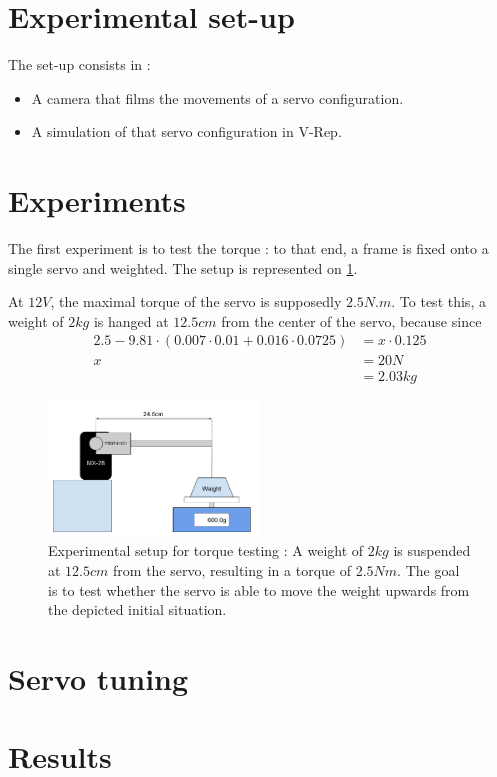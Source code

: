 \section{Experimental set-up}
The set-up consists in :
\begin{itemize}
\item A camera that films the movements of a servo configuration.
\item A simulation of that servo configuration in V-Rep.
\end{itemize}

\section{Experiments}
The first experiment is to test the torque : to that end, a frame is fixed onto a single servo and weighted. The setup is represented on \cref{fig:exp1}.

At $12V$, the maximal torque\cite{mx_28_manual} of the servo is supposedly $2.5N.m$. To test this, a weight of $2kg$ is hanged at $12.5cm$ from the center of the servo, because since 
\begin{align*}
2.5 - 9.81 \cdot (0.007 \cdot 0.01 + 0.016 \cdot 0.0725) &= x \cdot 0.125\\
x &= 20 N\\
&= 2.03 kg
\end{align*}

\begin{figure}[htp]
\center
    \includegraphics[width = 0.5\textwidth]{figures/exp1}
    \caption[Experimental setup for torque testing]{Experimental setup for torque testing : A weight of $2kg$ is suspended at $12.5cm$ from the servo, resulting in a torque of $2.5Nm$. The goal is to test whether the servo is able to move the weight upwards from the depicted initial situation.}
    \label{fig:exp1}
\end{figure}

\section{Servo tuning}

\section{Results}